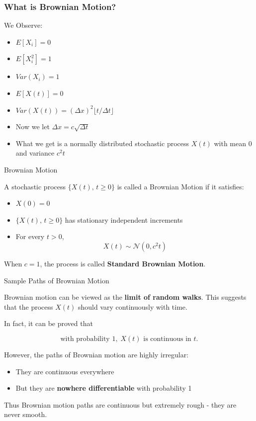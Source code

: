 \documentclass{beamer}
\begin{document}
	\begin{frame}
		\frametitle{What is Brownian Motion?}
		We Observe:
		\begin{itemize}[<+->]
			\item $E[X_i] = 0$
			\item $E[X_i^2] = 1$
			\item $Var(X_i) = 1$
			\item $E[X(t)] = 0$
			\item $Var(X(t)) = (\Delta x)^2 \lfloor t/\Delta t \rfloor$
			\item Now we let $\Delta x = c\sqrt{\Delta t}$
			\item What we get is a normally distributed stochastic process $X(t)$ with mean $0$ and variance $c^2 t$
		\end{itemize}
	\end{frame}
	
	\begin{frame}{Brownian Motion}
		
		A stochastic process $\{X(t),\, t \ge 0\}$ is called a 
		Brownian Motion if it satisfies:
		
		\begin{itemize}[<+->]
			\item $X(0) = 0$
			\item $\{X(t),\, t \ge 0\}$ has stationary independent increments
			\item For every $t > 0$, 
			\[
			X(t) \sim \mathcal{N}(0, c^{2}t)
			\]
		\end{itemize}
		
		\pause
		
		When $c=1$, the process is called \textbf{Standard Brownian Motion}.
		
	\end{frame}
	
	\begin{frame}{Sample Paths of Brownian Motion}
		
		Brownian motion can be viewed as the \textbf{limit of random walks}.
		This suggests that the process $X(t)$ should vary continuously with time.
		
		\pause
		
		In fact, it can be proved that
		
		\[
		\text{with probability }1,\; X(t)\text{ is continuous in }t.
		\]
		
		\pause
		
		However, the paths of Brownian motion are highly irregular:
		
		\begin{itemize}
			\item They are continuous everywhere
			\item But they are \textbf{nowhere differentiable} with probability 1
		\end{itemize}
		
		\pause
		
		Thus Brownian motion paths are continuous but extremely rough
		- they are never smooth.
		
	\end{frame}
	
\end{document}
